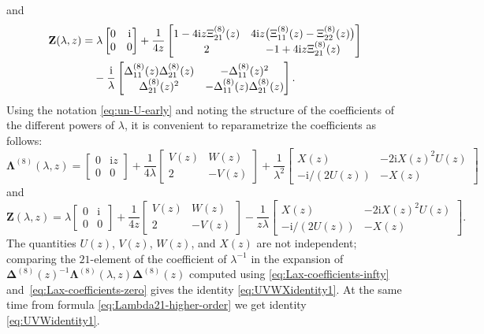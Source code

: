 \documentclass[pdftex]{sigma}
\numberwithin{equation}{section}
\newcommand{\ii}{\mathrm{i}}
\begin{document}
and
\begin{align*}
 & \mathbf{Z}(\lambda,z)= \lambda\begin{bmatrix}0 & {\ii}{} \\0&0\end{bmatrix}+\frac{1}{4z}\begin{bmatrix}
 1-{4\ii z}{}\Xi^{(8)}_{21}(z) &{4\ii z}{}\big(\Xi^{(8)}_{11}(z)-\Xi^{(8)}_{22}(z)\big) \\2 & -1+{4\ii z}{}\Xi^{(8)}_{21}(z)
 \end{bmatrix} \\
 &\hphantom{\mathbf{Z}(\lambda,z)=}{} -
 \frac{\ii }{ \lambda}\begin{bmatrix}\Delta^{(8)}_{11}(z)\Delta^{(8)}_{21}(z) & -\Delta^{(8)}_{11}(z)^2 \\
 \Delta^{(8)}_{21}(z)^2 & -\Delta^{(8)}_{11}(z)\Delta^{(8)}_{21}(z)\end{bmatrix}.
\end{align*}
Using the notation \eqref{eq:un-U-early} and noting the structure of the coefficients of the different powers of $\lambda$, it is convenient to reparametrize the coefficients as follows:
\begin{equation*}
 \mathbf{\Lambda}^{(8)}(\lambda,z)=\begin{bmatrix}0&{\ii z}{} \\0&0\end{bmatrix} +\frac{1}{4\lambda}\begin{bmatrix}V(z) & W(z)\\2 & -V(z)\end{bmatrix} +\frac{1}{\lambda^2}\begin{bmatrix} X(z) & -2 \ii X(z)^2U(z)\\-\ii/(2U(z)) & -X(z)\end{bmatrix}
\end{equation*}
and
\begin{equation*} \mathbf{Z}(\lambda,z)=\lambda\begin{bmatrix}0&{\ii}{} \\0&0\end{bmatrix} + \frac{1}{4z}\begin{bmatrix}V(z) & W(z)\\2 & -V(z)\end{bmatrix}-\frac{1}{z\lambda}\begin{bmatrix}X(z) & -2\ii X(z)^2U(z)\\-\ii/(2U(z)) & -X(z)\end{bmatrix}.
\end{equation*}
The quantities $U(z)$, $V(z)$, $W(z)$, and $X(z)$ are not independent; comparing the $21$-element of the coefficient of $\lambda^{-1}$ in the expansion of $\mathbf{\Delta}^{(8)}(z)^{-1}\mathbf{\Lambda}^{(8)}(\lambda,z)\mathbf{\Delta}^{(8)}(z)$ computed using \eqref{eq:Lax-coefficients-infty} and~\eqref{eq:Lax-coefficients-zero} gives the identity \eqref{eq:UVWXidentity1}.
At the same time from formula \eqref{eq:Lambda21-higher-order} we get identity \eqref{eq:UVWidentity1}.
\end{document}
